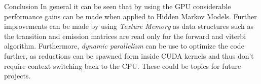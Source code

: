 \documentclass[11pt]{beamer}
\begin{document}
\begin{frame}{Conclusion}
In general it can be seen that by using the GPU considerable performance gains can be made when applied to Hidden Markov Models. Further improvements can be made by using \textit{Texture Memory} \cite{cuhmm} as data structures such as the transition and emission matrices are read only for the forward and viterbi algorithm. Furthermore, \textit{dynamic parallelism} can be use to optimize the code further, as reductions can be spawned form inside CUDA kernels and thus don't require context switching back to the CPU. These could be topics for future projects.

\end{frame}
\end{document}
